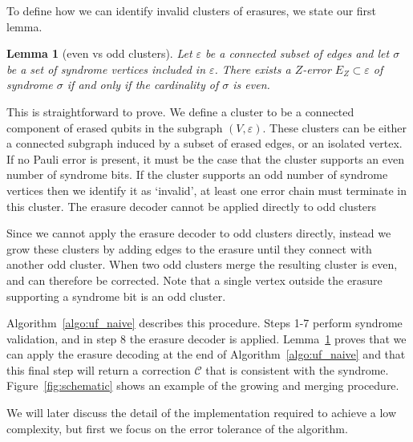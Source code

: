 \documentclass[a4paper, 10pt, accepted=2021-11-03]{quantumarticle}
\newtheorem{lemma}{Lemma}
\newcommand{\e}{\varepsilon}
\begin{document}
\medskip
To define how we can identify invalid clusters of erasures, we state our first lemma.

\begin{lemma}[even vs odd clusters] \label{lemma:erasure_decoding_parity_condition}
Let $\e$ be a connected subset of edges and let $\sigma$ be a set of syndrome 
vertices included in $\e$.
There exists a  $Z$-error $E_Z \subset \e$ of syndrome $\sigma$ if and only if
the cardinality of $\sigma$ is even.
\end{lemma}


This is straightforward to prove. 
We define a cluster to be a connected component of erased qubits in the subgraph $(V,\e)$.
These clusters can be either a connected subgraph induced by a subset of erased edges, 
or an isolated vertex.
If no Pauli error is present, it must be the case that the cluster supports an even number
of syndrome bits. If the cluster supports an odd number of syndrome vertices then we identify it as `invalid', at least 
one error chain must terminate in this cluster. The erasure decoder cannot be applied
directly to odd clusters

\medskip
Since we cannot apply the erasure decoder to odd clusters directly, instead we grow these clusters
by adding edges to the erasure until they connect with another odd cluster. When two odd clusters merge
the resulting cluster is even, and can therefore be corrected. 
Note that a single vertex outside the erasure supporting a syndrome bit is an odd cluster.

\medskip
Algorithm~\ref{algo:uf_naive} describes this procedure. Steps 1-7 
perform syndrome validation, and in step 8 the erasure decoder is applied. 
Lemma~\ref{lemma:erasure_decoding_parity_condition} proves that we can apply the erasure decoding at the end of Algorithm~\ref{algo:uf_naive} 
and that this final step will return a correction $\mathcal{C}$ that is consistent with the syndrome.
Figure~\ref{fig:schematic} shows
an example of the growing and merging procedure. 

\medskip
We will later discuss the detail of the implementation required to achieve a low complexity, but first we
focus on the error tolerance of the algorithm. 
\end{document}
